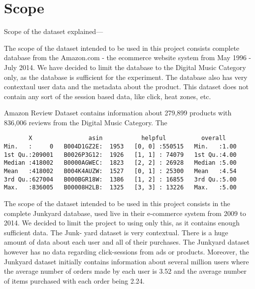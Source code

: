 \section{Scope}

Scope of the dataset explained---

The scope of the dataset intended to be used in this project consists complete database from the Amazon.com - the ecommerce website system from May 1996 - July 2014. We have decided to limit the database to the Digital Music Category only, as the database is sufficient for the experiment. The database also has very contextaul user data and the metadata about the product. This dataset does not contain any sort of the session based data, like click, heat zones, etc.

Amazon Review Dataset contains information about 279,899 products with 836,006 reviews from the Digital Music Category.
The    


\begin{verbatim}
       X                asin           helpful          overall    
Min.   :     0   B004D1GZ2E:  1953   [0, 0] :550515   Min.   :1.00  
1st Qu.:209001   B0026P3G12:  1926   [1, 1] : 74079   1st Qu.:4.00  
Median :418002   B0000AGWEC:  1823   [2, 2] : 26928   Median :5.00  
Mean   :418002   B004K4AUZW:  1527   [0, 1] : 25300   Mean   :4.54  
3rd Qu.:627004   B000BGR18W:  1386   [1, 2] : 16855   3rd Qu.:5.00  
Max.   :836005   B00008H2LB:  1325   [3, 3] : 13226   Max.   :5.00  
\end{verbatim}





The scope of the dataset intended to be used in this project consists in the complete
Junkyard database, used live in their e-commerce system from 2009 to 2014. We decided
to limit the project to using only this, as it contains enough sufficient data. The Junk-
yard dataset is very contextual. There is a huge amount of data about each user and all
of their purchases. The Junkyard dataset however has no data regarding click-sessions
from ads or products.
Moreover, the Junkyard dataset initially contains information about several million users
where the average number of orders made by each user is 3.52 and the average number
of items purchased with each order being 2.24.


